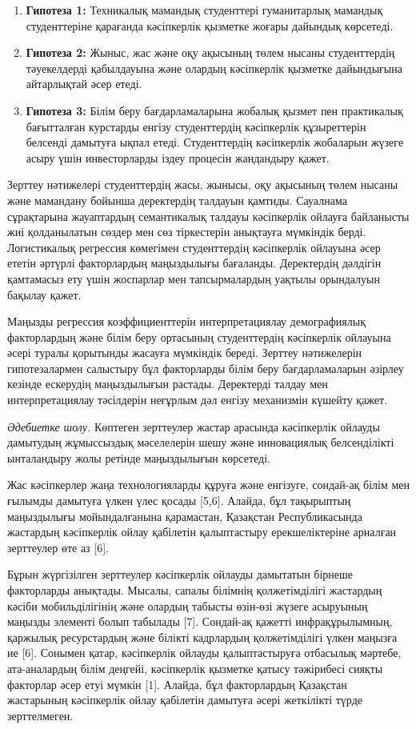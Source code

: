 \begin{enumerate}
\def\labelenumi{\arabic{enumi}.}
\item
  {\bfseries Гипотеза 1:} Техникалық мамандық студенттері гуманитарлық
  мамандық студенттеріне қарағанда кәсіпкерлік қызметке жоғары дайындық
  көрсетеді.
\item
  {\bfseries Гипотеза 2:} Жыныс, жас және оқу ақысының төлем нысаны
  студенттердің тәуекелдерді қабылдауына және олардың кәсіпкерлік
  қызметке дайындығына айтарлықтай әсер етеді.
\item
  {\bfseries Гипотеза 3:} Білім беру бағдарламаларына жобалық қызмет пен
  практикалық бағытталған курстарды енгізу студенттердің кәсіпкерлік
  құзыреттерін белсенді дамытуға ықпал етеді. Студенттердің кәсіпкерлік
  жобаларын жүзеге асыру үшін инвесторларды іздеу процесін жандандыру
  қажет.
\end{enumerate}

Зерттеу нәтижелері студенттердің жасы, жынысы, оқу ақысының төлем нысаны
және мамандану бойынша деректердің талдауын қамтиды. Сауалнама
сұрақтарына жауаптардың семантикалық талдауы кәсіпкерлік ойлауға
байланысты жиі қолданылатын сөздер мен сөз тіркестерін анықтауға
мүмкіндік берді. Логистикалық регрессия көмегімен студенттердің
кәсіпкерлік ойлауына әсер ететін әртүрлі факторлардың маңыздылығы
бағаланды. Деректердің дәлдігін қамтамасыз ету үшін жоспарлар мен
тапсырмалардың уақтылы орындалуын бақылау қажет.

Маңызды регрессия коэффициенттерін интерпретациялау демографиялық
факторлардың және білім беру ортасының студенттердің кәсіпкерлік
ойлауына әсері туралы қорытынды жасауға мүмкіндік береді. Зерттеу
нәтижелерін гипотезалармен салыстыру бұл факторларды білім беру
бағдарламаларын әзірлеу кезінде ескерудің маңыздылығын растады.
Деректерді талдау мен интерпретациялау тәсілдерін неғұрлым дәл енгізу
механизмін күшейту қажет.

\emph{Әдебиетке шолу.} Көптеген зерттеулер жастар арасында кәсіпкерлік
ойлауды дамытудың жұмыссыздық мәселелерін шешу және инновациялық
белсенділікті ынталандыру жолы ретінде маңыздылығын көрсетеді.

Жас кәсіпкерлер жаңа технологияларды құруға және енгізуге, сондай-ақ
білім мен ғылымды дамытуға үлкен үлес қосады {[}5,6{]}. Алайда, бұл
тақырыптың маңыздылығы мойындалғанына қарамастан, Қазақстан
Республикасында жастардың кәсіпкерлік ойлау қабілетін қалыптастыру
ерекшеліктеріне арналған зерттеулер өте аз {[}6{]}.

Бұрын жүргізілген зерттеулер кәсіпкерлік ойлауды дамытатын бірнеше
факторларды анықтады. Мысалы, сапалы білімнің қолжетімділігі жастардың
кәсіби мобильділігінің және олардың табысты өзін-өзі жүзеге асыруының
маңызды элементі болып табылады {[}7{]}. Сондай-ақ қажетті
инфрақұрылымның, қаржылық ресурстардың және білікті кадрлардың
қолжетімділігі үлкен маңызға ие {[}6{]}. Сонымен қатар, кәсіпкерлік
ойлауды қалыптастыруға отбасылық мәртебе, ата-аналардың білім деңгейі,
кәсіпкерлік қызметке қатысу тәжірибесі сияқты факторлар әсер етуі мүмкін
{[}1{]}. Алайда, бұл факторлардың Қазақстан жастарының кәсіпкерлік ойлау
қабілетін дамытуға әсері жеткілікті түрде зерттелмеген.

